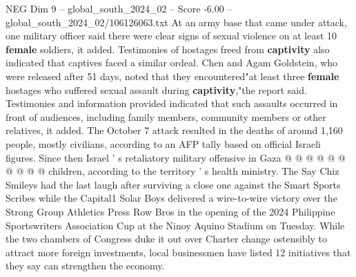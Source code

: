 \begin{textsample}{NEG Dim 9 – global\_south\_2024\_02 – Score -6.00 – global\_south\_2024\_02/106126063.txt}
At an army base that came under attack, one military officer said there were clear signs of sexual violence on at least 10 \textbf{female} soldiers, it added.
Testimonies of hostages freed from \textbf{captivity} also indicated that captives faced a similar ordeal.
Chen and Agam Goldstein, who were released after 51 days, noted that they encountered"at least three \textbf{female} hostages who suffered sexual assault during \textbf{captivity},"the report said.
Testimonies and information provided indicated that such assaults occurred in front of audiences, including family members, community members or other relatives, it added.
The October 7 attack resulted in the deaths of around 1,160 people, mostly civilians, according to an AFP tally based on official Israeli figures.
Since then Israel ' s retaliatory military offensive in Gaza @ @ @ @ @ @ @ @ @ @ children, according to the territory ' s health ministry.
The Say Chiz Smileys had the last laugh after surviving a close one against the Smart Sports Scribes while the Capital1 Solar Boys delivered a wire-to-wire victory over the Strong Group Athletics Press Row Bros in the opening of the 2024 Philippine Sportswriters Association Cup at the Ninoy Aquino Stadium on Tuesday.
While the two chambers of Congress duke it out over Charter change ostensibly to attract more foreign investments, local businessmen have listed 12 initiatives that they say can strengthen the economy.

\end{textsample}
